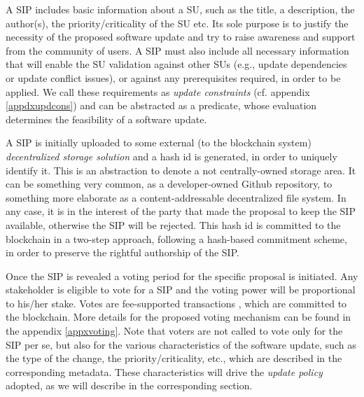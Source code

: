 A SIP includes basic information about a SU, such as the title, a description, the author(s), the priority/criticality of the SU etc. Its sole purpose is to justify the necessity of the proposed software update and try to raise awareness and support from the community of users. A SIP must also include all necessary information that will enable the SU validation against other SUs (e.g., update dependencies or update conflict issues), or against any prerequisites required, in order to be applied. We call these requirements as \emph{update constraints} (cf. appendix \ref{appdxupdcons}) and can be abstracted as a predicate, whose evaluation determines the feasibility of a software update.  

A SIP is initially uploaded to some external (to the blockchain system) \emph{decentralized storage solution} and a hash id is generated, in order to uniquely identify it. This is an abstraction to denote a not centrally-owned storage area.%
  It can be something very common, as a developer-owned Github repository, to something more elaborate as a content-addressable decentralized file system. In any case, it is in the interest of the party that made the proposal to keep the SIP available, otherwise the SIP will be rejected.
 This hash id is committed to the blockchain in a two-step approach, following a hash-based commitment scheme, in order to preserve the rightful authorship of the SIP.

Once the SIP is revealed a voting period for the specific proposal is initiated. Any stakeholder is eligible to vote for a SIP and the voting power will be proportional to his/her stake. Votes are fee-supported transactions
, which are committed to the blockchain. More details for the proposed voting mechanism can be found in the appendix \ref{appxvoting}. Note that voters are not called to vote only for the SIP per se, but also for the various characteristics of the software update, such as the type of the change, the priority/criticality, etc., which are described in the corresponding metadata. These characteristics will drive the \emph{update policy} adopted, as we will describe in the corresponding section.


